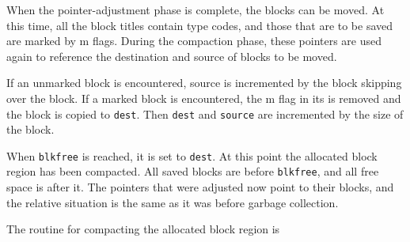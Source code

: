 When the pointer-adjustment phase is complete, the blocks can be
moved. At this time, all the block titles contain type codes, and
those that are to be saved are marked by m flags. During the
compaction phase, these pointers are used again to reference the
destination and source of blocks to be moved.

If an unmarked block is encountered, source is incremented by the
block skipping over the block. If a marked block is encountered, the m
flag in its is removed and the block is copied to \texttt{dest}. Then
\texttt{dest} and \texttt{source} are incremented by the size of the
block.

When \texttt{blkfree} is reached, it is set to \texttt{dest}. At this
point the allocated block region has been compacted. All saved blocks
are before \texttt{blkfree}, and all free space is after it. The
pointers that were adjusted now point to their blocks, and the
relative situation is the same as it was before garbage collection.

The routine for compacting the allocated block region is


